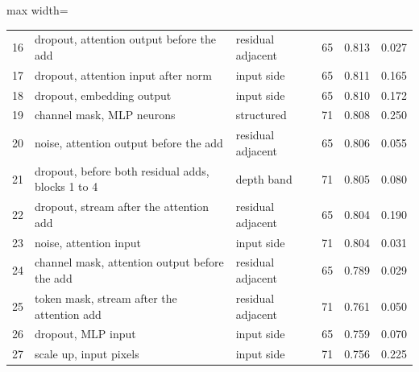 \begin{table}[htbp]
\begin{adjustbox}{max width=\linewidth}
\begin{tabular}{rllrrr}
16 & dropout, attention output before the add & residual adjacent & 65 & 0.813 & 0.027 \\
17 & dropout, attention input after norm & input side & 65 & 0.811 & 0.165 \\
18 & dropout, embedding output & input side & 65 & 0.810 & 0.172 \\
19 & channel mask, MLP neurons & structured & 71 & 0.808 & 0.250 \\
20 & noise, attention output before the add & residual adjacent & 65 & 0.806 & 0.055 \\
21 & dropout, before both residual adds, blocks 1 to 4 & depth band & 71 & 0.805 & 0.080 \\
22 & dropout, stream after the attention add & residual adjacent & 65 & 0.804 & 0.190 \\
23 & noise, attention input & input side & 71 & 0.804 & 0.031 \\
24 & channel mask, attention output before the add & residual adjacent & 65 & 0.789 & 0.029 \\
25 & token mask, stream after the attention add & residual adjacent & 71 & 0.761 & 0.050 \\
26 & dropout, MLP input & input side & 65 & 0.759 & 0.070 \\
27 & scale up, input pixels & input side & 71 & 0.756 & 0.225 \\
\bottomrule
\end{tabular}
\end{adjustbox}
\end{table}

